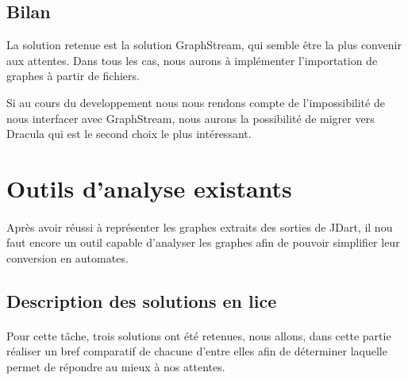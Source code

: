   \subsection{Bilan}
  La solution retenue est la solution GraphStream, qui semble être la plus convenir aux attentes. Dans tous les cas, nous aurons à implémenter l'importation de graphes à partir de fichiers.
  
  Si au cours du developpement nous nous rendons compte de l'impossibilité de nous interfacer avec GraphStream, nous aurons la possibilité de migrer vers Dracula qui est le second choix le plus intéressant.
  

  \section{Outils d'analyse existants}

  \paragraph{}
  Après avoir réussi à représenter les graphes extraits des sorties de JDart, il nou faut encore un outil capable d'analyser les graphes afin de pouvoir simplifier leur conversion en automates.

  \subsection{Description des solutions en lice}
  \paragraph{}
  Pour cette tâche, trois solutions ont été retenues, nous allons, dans cette partie réaliser un bref comparatif de chacune d'entre elles afin de déterminer laquelle permet de répondre au mieux à nos attentes.
  
